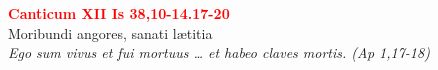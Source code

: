 


\def\greinitialformat#1{%
{\fontsize{39}{39}\selectfont #1}%
}




\vspace{0.3cm}
\begin{center}
 \textcolor{red}{\large \bf Canticum XII Is 38,10-14.17-20}\\
Moribundi angores, sanati lætitia\\
\textit{\small Ego sum vivus et fui mortuus … et habeo claves mortis. (Ap 1,17-18)}
\end{center}
